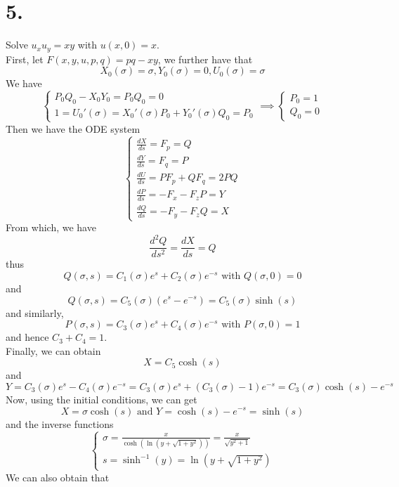 \documentclass[11pt]{article}
\theoremstyle{mystyle}
\theoremstyle{definition}
\begin{document}
\section*{5.}
Solve $u_x u_y = xy$ with $u(x,0) = x$. \\
First, let $F(x,y,u,p,q) = pq - xy$, we further have that 
\begin{equation}
  X_0(\sigma) = \sigma, Y_0(\sigma) = 0, U_0(\sigma) = \sigma 
\end{equation}
We have 
\[
  \begin{cases}
    P_0Q_0 - X_0Y_0 = P_0 Q_0 = 0 \\
    1 = U_0'(\sigma) = X_0'(\sigma) P_0 + Y_0'(\sigma) Q_0 = P_0 
  \end{cases}
  \implies 
  \begin{cases}
    P_0 = 1 \\
    Q_0 = 0
  \end{cases}
\]
Then we have the ODE system 
\[
  \begin{cases}
    \displaystyle\frac{dX}{ds} = F_p = Q \\
    \displaystyle\frac{dY}{ds} = F_q = P \\
    \displaystyle\frac{dU}{ds} = PF_p + QF_q = 2PQ  \\
    \displaystyle\frac{dP}{ds} = -F_x - F_z P  =  Y  \\
    \displaystyle\frac{dQ}{ds} = -F_y - F_z Q = X  
  \end{cases}
\]
From which, we have
\[
  \displaystyle\frac{d^2Q}{ds^2} = \displaystyle\frac{dX}{ds} = Q 
\]
thus 
\[
  Q(\sigma, s) = C_1(\sigma) e^s + C_2(\sigma) e^{-s} \text{ with } Q(\sigma, 0) = 0
\]
and 
\[
  Q(\sigma, s) = C_5(\sigma)(e^s - e^{-s}) = C_5(\sigma) \sinh(s) 
\]
and similarly, 
\[
  P(\sigma, s) = C_3(\sigma) e^s + C_4(\sigma) e^{-s} \text{ with } P(\sigma, 0) = 1
\]
and hence $C_3 + C_4 = 1$. \\ 
Finally, we can obtain 
\[
  X = C_5\cosh(s)
\]
and 
\[
  Y = C_3(\sigma) e^s - C_4(\sigma) e^{-s} = C_3(\sigma) e^s + (C_3(\sigma) - 1) e^{-s} = C_3(\sigma)\cosh(s) - e^{-s}
\]
Now, using the initial conditions, we can get 
\[
  X = \sigma \cosh(s) \text{ and } Y = \cosh(s) - e^{-s} = \sinh(s)
\]
and the inverse functions
\[
  \begin{cases}
    \sigma = \displaystyle\frac{x}{\cosh(\ln(y + \sqrt{1+y^2}))} = \displaystyle\frac{x}{\sqrt{y^2+1}}\\
    s = \sinh^{-1}(y) = \ln(y + \sqrt{1 + y^2})
  \end{cases}
\]
We can also obtain that 
\end{document}
